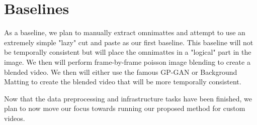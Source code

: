 \documentclass{article}
\begin{document}
\section{Baselines}
As a baseline, we plan to manually extract omnimattes and attempt to use an extremely simple "lazy" cut and paste as our first baseline. This baseline will not be temporally consistent but will place the omnimattes in a "logical" part in the image. We then will perform frame-by-frame poisson image blending to create a blended video. We then will either use the famous GP-GAN\cite{10.1145/3343031.3350944} or Background Matting \cite{BMSengupta20} to create the blended video that will be more temporally consistent.

Now that the data preprocessing and infrastructure tasks have been finished, we plan to now move our focus towards running our proposed method for custom videos.

\printbibliography
\end{document}
